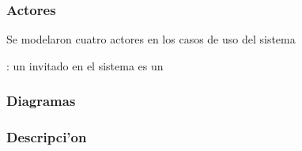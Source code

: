 \subsubsection{Actores}
Se modelaron cuatro actores en los casos de uso del sistema

: un invitado en el sistema es un




\subsubsection{Diagramas}

\subsubsection{Descripci'on}

